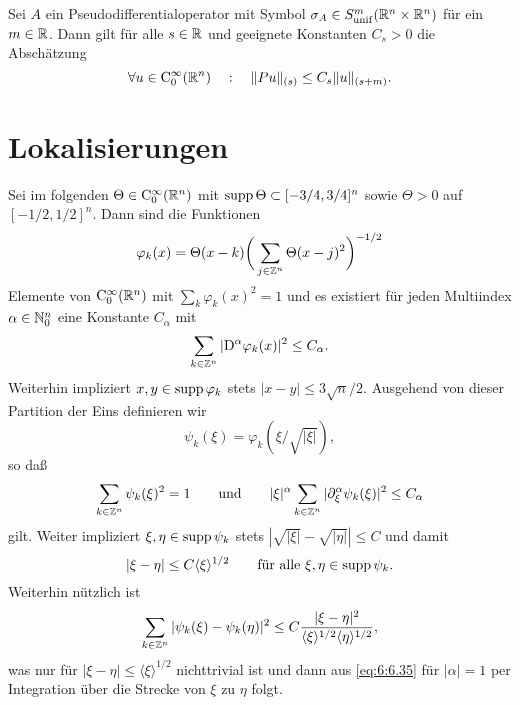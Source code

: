 \begin{cor}
Sei $A$ ein Pseudodifferentialoperator mit Symbol $\sigma_A\in S^m_{\rm unif}(\mathbb R^n\times\mathbb R^n)$ für ein $m\in\mathbb R$. Dann gilt für alle $s\in\mathbb R$ und geeignete Konstanten $C_s>0$ die Abschätzung
\begin{equation}
  \forall u\in\mathrm C_0^\infty(\mathbb R^n)\quad:\quad \|Pu \|_{(s)} \le C_s \|u\|_{(s+m)}.
\end{equation}
\end{cor}



\section{Lokalisierungen}
Sei im folgenden $\Theta\in\mathrm C_0^\infty(\mathbb R^n)$ mit $\operatorname{supp}\Theta\subset [-3/4,3/4]^n$ sowie $\Theta>0$ auf $[-1/2,1/2]^n$. Dann sind die Funktionen
\begin{equation}
\varphi_k(x) = \Theta(x-k) \bigg(\sum_{j\in\mathbb Z^n} \Theta(x-j)^2\bigg)^{-1/2}
\end{equation}
Elemente von $\mathrm C_0^\infty(\mathbb R^n)$ mit $\sum_{k} \varphi_k(x)^2=1$ und es existiert für jeden Multiindex $\alpha\in\mathbb N_0^n$ eine Konstante $C_\alpha$ mit
\begin{equation}
    \sum_{k\in\mathbb Z^n} | \mathrm D^\alpha \varphi_k(x)|^2 \le C_\alpha.
\end{equation}
Weiterhin impliziert $x,y\in\operatorname{supp}\varphi_k$ stets $|x-y|\le 3\sqrt n/2$. Ausgehend von dieser Partition der Eins definieren wir
\begin{equation}
    \psi_k(\xi)= \varphi_k(\xi / \sqrt{|\xi|}), 
\end{equation}
so daß
\begin{equation}\label{eq:6:6.35} 
    \sum_{k\in\mathbb Z^n} \psi_k(\xi)^2 = 1\qquad\text{und}\qquad |\xi|^\alpha \sum_{k\in\mathbb Z^n} |\partial_\xi^\alpha \psi_k(\xi)|^2 \le C_\alpha
\end{equation}
gilt. Weiter impliziert $\xi,\eta\in\operatorname{supp}\psi_k$ stets $|\sqrt{|\xi|}-\sqrt{|\eta|}|\le C$ und damit 
\begin{equation}
 |\xi-\eta|\le C \langle\xi\rangle^{1/2} \qquad\text{für alle $\xi,\eta\in\operatorname{supp}\psi_k$}.
\end{equation}
Weiterhin nützlich ist
\begin{equation}
  \sum_{k\in\mathbb Z^n} |\psi_k(\xi)-\psi_k(\eta)|^2 \le C \frac{|\xi-\eta|^2}{ \langle\xi\rangle^{1/2} \langle\eta\rangle^{1/2}},
\end{equation} 
was nur für $|\xi-\eta|\le \langle\xi\rangle^{1/2}$ nichttrivial ist und dann aus \eqref{eq:6:6.35} für $|\alpha|=1$ per Integration über die Strecke von $\xi$ zu $\eta$ folgt.



